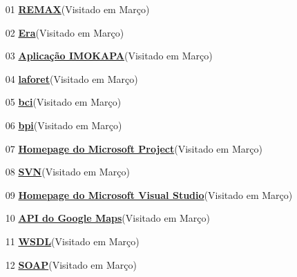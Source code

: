 

\begin{itemize}

\item [01]  \textbf{\href{http://www.remax.pt}{REMAX}}(Visitado em Março) \\
\item [02]  \textbf{\href{http://www.era.pt}{Era}}(Visitado em Março) \\
\item [03]  \textbf{\href{http://www.imokapa.com}{Aplicação IMOKAPA}}(Visitado em Março) \\
\item [04]  \textbf{\href{http://www.laforet.pt}{laforet}}(Visitado em Março) \\
\item [05]  \textbf{\href{http://www.bci.cgd.pt}{bci}}(Visitado em Março) \\
\item [06]  \textbf{\href{http://www.aeiou.bpiexpressoimobiliario.pt}{bpi}}(Visitado em Março)\\
\item [07]  \textbf{\href{http://www.office.microsoft.com/pt-br/project/FX100487771046.aspx}{Homepage do Microsoft Project}}(Visitado em Março)\\
\item [08]  \textbf{\href{http://www.subversion.tigris.org}{SVN}}(Visitado em Março) \\
\item [09]  \textbf{\href{http://www.msdn.microsoft.com/en-us/vstudio/default.aspx}{Homepage do Microsoft Visual Studio}}(Visitado em Março)\\
\item [10]  \textbf{\href{http://www.code.google.com/apis/maps/}{API do Google Maps}}(Visitado em Março) \\
\item [11]  \textbf{\href{http://www.w3.org/TR/wsdl}{WSDL}}(Visitado em Março) \\
\item [12]  \textbf{\href{http://www.pt.wikipedia.org/wiki/SOAP}{SOAP}}(Visitado em Março) \\

\end{itemize}
